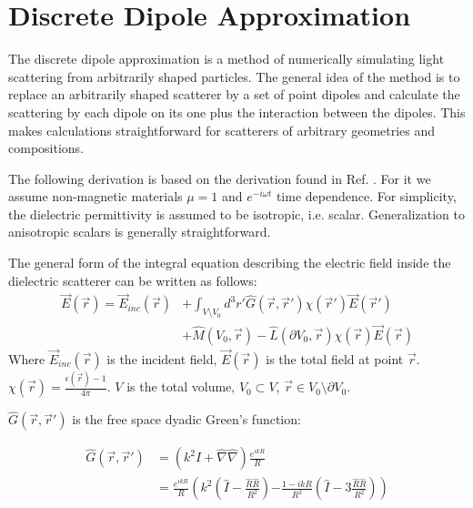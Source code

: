 \section{Discrete Dipole Approximation}
\label{ap:DDA}

    The discrete dipole approximation is a method of numerically simulating light scattering from arbitrarily shaped particles.
    The general idea of the method is to replace an arbitrarily shaped scatterer by a set of point dipoles and calculate the
    scattering by each dipole on its one plus the interaction between the dipoles. This makes calculations straightforward
    for scatterers of arbitrary geometries and compositions.

    The following derivation is based on the derivation found in Ref. \cite{yurkin2007discrete}. For it we assume
    non-magnetic materials $\mu = 1$ and $e^{-i\omega t}$ time dependence. For simplicity, the dielectric permittivity is assumed
    to be isotropic, i.e. scalar. Generalization to anisotropic scalars is generally straightforward.

    The general form of the integral equation describing the electric field inside the dielectric scatterer can be written as follows:
    \begin{align}
        \vec{E}(\vec{r}) = \vec{E}_{inc}(\vec{r}) &+ \int_{V \setminus V_0}d^3r' \hat{G}(\vec{r}, \vec{r}')\chi(\vec{r}')\vec{E}(\vec{r}')\nonumber\\
                        &+ \hat{M}(V_0, \vec{r}) - \hat{L}(\partial V_0, \vec{r})\chi(\vec{r})\vec{E}(\vec{r})
    \end{align}
    Where $\vec{E}_{inc}(\vec{r})$ is the incident field, $\vec{E}(\vec{r})$ is the total field at point $\vec{r}$.
    $\chi(\vec{r}) = \frac{\epsilon(\vec{r}) - 1}{4\pi}$. $V$ is the total volume, $V_0 \subset V$, $\vec{r} \in V_0\setminus \partial V_0$.

    $\hat{G}(\vec{r}, \vec{r}')$ is the free space dyadic Green's function:

    \begin{align}
        \hat{G}(\vec{r}, \vec{r}') &= \left(k^2\hat{I}+\hat{\nabla}\hat{\nabla}\right)\frac{e^{ikR}}{R} \\
                                    &= \frac{e^{ikR}}{R}\left(k^2\left(\hat{I}-\frac{\hat{R}\hat{R}}{R^2}\right)\right.
                                        \left.-\frac{1-ikR}{R^2}\left(\hat{I} -3 \frac{\hat{R}\hat{R}}{R^2}\right)\right)
    \end{align}

